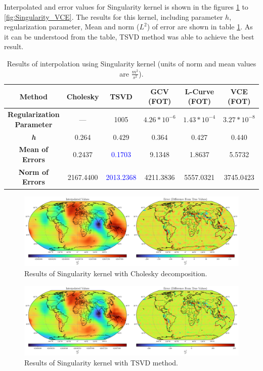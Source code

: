 \documentclass[12pt]{article}
\begin{document}
	Interpolated and error values for Singularity kernel is shown in the figures \ref{fig:Singularity_Chol} to \ref{fig:Singularity_VCE}. The results for this kernel, including parameter $h$, regularization parameter, Mean and norm ($L^2$) of error are shown in table \ref{tab:Singularity_Results}. As it can be understood from the table, TSVD method was able to achieve the best result.
	
	\begin{table}[h!]
		\centering
		\caption{Results of interpolation using Singularity kernel (units of norm and mean values are $\frac{m^2}{s^2}$).}
		\vspace{0.2cm}
		\renewcommand{\arraystretch}{2}
		\begin{tabular}{c|c|c|c|c|c}
			\textbf{Method} & Cholesky & TSVD & GCV (FOT) & L-Curve (FOT) & VCE (FOT) \\
			\hline 
			\makecell{\textbf{Regularization} \\ \textbf{Parameter}} & --- & 1005 & $4.26*10^{-6}$ & $1.43*10^{-4}$ & $3.27*10^{-8}$ \\
			\hline 
			\textit{\textbf{h}} & 0.264 & 0.429 & 0.364 & 0.427 & 0.440 \\
			\hline
			\textbf{Mean of Errors} & 0.2437 & \textcolor{blue}{0.1703} & 9.1348 & 1.8637 & 5.5732 \\
			\hline 
			\textbf{Norm of Errors} & 2167.4400 & \textcolor{blue}{2013.2368} & 4211.3836 & 5557.0321 & 3745.0423 \\
		\end{tabular}
		\label{tab:Singularity_Results}
	\end{table}
	
	
	\begin{figure}[h!]
		\centering
		\includegraphics[width=16cm]{../Outputs/Plots/Plot_Singularity_Cholesky.pdf}
		\caption{Results of Singularity kernel with Cholesky decomposition.}
		\label{fig:Singularity_Chol}
	\end{figure}
	
	\begin{figure}[h!]
		\centering
		\includegraphics[width=16cm]{../Outputs/Plots/Plot_Singularity_TSVD.pdf}
		\caption{Results of Singularity kernel with TSVD method.}
		\label{fig:Singularity_TSVD}
	\end{figure}
	
\end{document}
